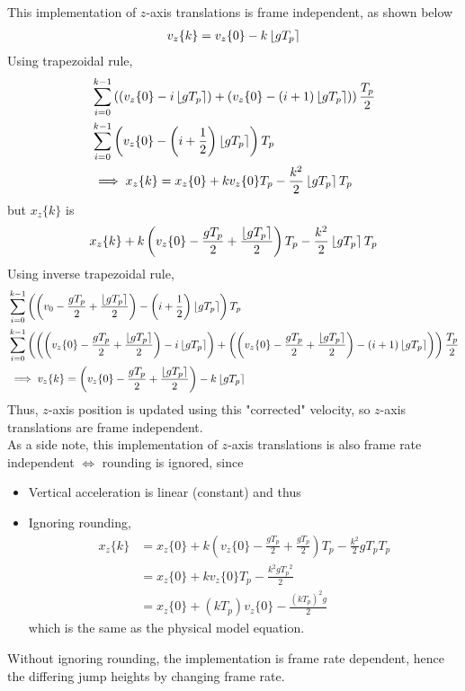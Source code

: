 This implementation of $z$-axis translations is frame independent, as shown below
\begin{align*}
v_z\{k\} = v_z\{0\} - k\left\lfloor gT_p\right\rceil
\end{align*}
Using trapezoidal rule,
\begin{align*}
&\sum_{i=0}^{k-1} \left((v_z\{0\} - i\left\lfloor gT_p\right\rceil) + (v_z\{0\} - (i + 1) \left\lfloor gT_p\right\rceil)\right) \frac{T_p}{2}\\
&\sum_{i=0}^{k-1} \left(v_z\{0\} - \left(i + \frac{1}{2} \right) \left\lfloor gT_p\right\rceil \right) T_p\\
&\implies x_z\{k\} = x_z\{0\} + k v_z\{0\} T_p - \frac{k^2}{2}\left\lfloor gT_p\right\rceil T_p\\
\end{align*}
but $x_z\{k\}$ is
\begin{align*}
x_z\{k\} + k\left(v_z\{0\} - \frac{gT_p}{2} + \frac{\left\lfloor gT_p\right\rceil}{2} \right) T_p - \frac{k^2}{2}\left\lfloor gT_p\right\rceil T_p\\
\end{align*}
Using inverse trapezoidal rule,
\begin{align*}
&\sum_{i=0}^{k-1} \left(\left(v_0 - \frac{gT_p}{2} + \frac{\left\lfloor gT_p\right\rceil}{2} \right) - \left(i + \frac{1}{2} \right) \left\lfloor gT_p\right\rceil \right) T_p\\
&\sum_{i=0}^{k-1} \left(\left(\left(v_z\{0\} - \frac{gT_p}{2} + \frac{\left\lfloor gT_p\right\rceil}{2} \right) - i\left\lfloor gT_p\right\rceil \right) + \left(\left(v_z\{0\} - \frac{gT_p}{2} + \frac{\left\lfloor gT_p\right\rceil}{2} \right) - (i + 1)\left\lfloor gT_p\right\rceil \right) \right) \frac{T_p}{2}\\
&\implies v_z\{k\} = \left(v_z\{0\} - \frac{gT_p}{2} + \frac{\left\lfloor gT_p\right\rceil}{2} \right) - k\left\lfloor gT_p\right\rceil
\end{align*}
Thus, $z$-axis position is updated using this "corrected" velocity, so $z$-axis translations are frame independent.\\

As a side note, this implementation of $z$-axis translations is also frame rate independent $\Longleftrightarrow$ rounding is ignored, since
\begin{itemize}
\item
Vertical acceleration is linear (constant) and thus
\item
Ignoring rounding,
\begin{align*}
x_z\{k\} &= x_z\{0\} + k\left(v_z\{0\} - \frac{gT_p}{2} + \frac{gT_p}{2} \right) T_p - \frac{k^2}{2} gT_p T_p\\
&= x_z\{0\} + kv_z\{0\} T_p - \frac{k^2 g{T_p}^2}{2}\\
&= x_z\{0\} + \left(kT_p \right) v_z\{0\} - \frac{\left(kT_p \right)^2 g}{2}
\end{align*}
which is the same as the physical model equation.
\end{itemize}
Without ignoring rounding, the implementation is frame rate dependent, hence the differing jump heights by changing frame rate.\\

